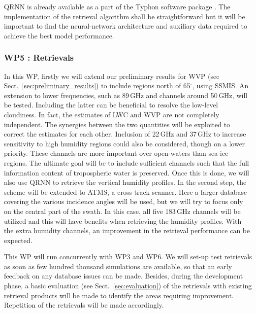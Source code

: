 \documentclass[12pt,oneside,a4paper]{article}
\begin{document}
QRNN is already available as a part of the Typhon software package
\citep{lemke:2020:typhon}. The implementation of the retrieval algorithm shall
be straightforward but it will be important to find the
neural-network architecture and auxiliary data required to achieve the best model performance.



\vspace{-1.0ex}
\subsubsection*{WP5 : Retrievals}
%
\label{sec:retrievals}
%
In this WP, firstly we will extend our preliminary results for WVP (see
Sect.~\ref{sec:preliminary_results}) to include regions north of 65$^\circ$,
using SSMIS. An extension to lower frequencies, such as 89\,GHz and channels around 50\,GHz, will be tested. Including the latter can be beneficial to resolve the low-level cloudiness. In fact, the estimates of LWC and WVP are not completely independent. The synergies between the two quantities will be exploited to correct the estimates for each other. Inclusion of 22\,GHz and 37\,GHz to increase sensitivity to high humidity regions could also be considered, though on a lower priority. These channels are more important over open-waters than sea-ice regions. The ultimate goal will be to include sufficient channels such that the full information content of tropospheric water is preserved. Once this is done, we will also use QRNN to retrieve the vertical humidity profiles. In the second step, the scheme will be extended to ATMS, a cross-track scanner. Here a larger database covering the various incidence angles will be used, but we will try to focus only on the central part of the swath. In this case, all five 183\,GHz channels will be utilized and this will have benefits when retrieving the humidity profiles. With the extra humidity channels, an improvement in the retrieval performance can be expected.  


This WP will run concurrently with WP3 and WP6. We will set-up test retrievals as soon as few hundred thousand simulations are available, so that an early feedback on any database issues can be made. Besides, during the development phase, a basic evaluation (see Sect.~\ref{sec:evaluation}) of the retrievals with existing retrieval products will be made to identify the areas requiring improvement. Repetition of the retrievals will be made accordingly.
\end{document}
